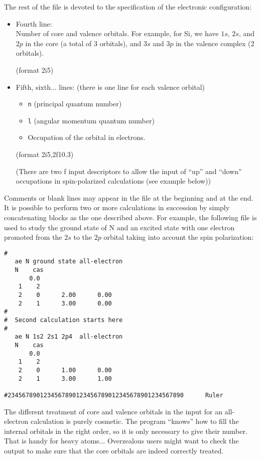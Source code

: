 \documentclass[11pt]{article}
\begin{document}
The rest of the file is devoted to the specification of the electronic
configuration:

\begin{itemize} 

\item Fourth line:\\
	 Number of core and valence orbitals. For example, for Si, we
	have $1s$, $2s$, and $2p$ in the core (a total of 3 orbitals), and
	$3s$ and $3p$ in the valence complex (2 orbitals).

	(format 2i5)

\item Fifth, sixth... lines: (there is one line for each valence
orbital)
	\begin{itemize}
	\item {\tt n} (principal quantum number)
	\item {\tt l} (angular momentum quantum number)
	\item Occupation of the orbital in electrons. 
	\end{itemize}

	(format 2i5,2f10.3)

	(There are two f input descriptors to allow the input of ``up''
	and ``down'' occupations in spin-polarized calculations (see
	example below))

\end{itemize}

Comments or blank lines may appear in the file at the beginning and at the end.
It is possible to perform two or more calculations in
succession by simply concatenating blocks as the one described above.
For example, the following file is used to study the ground state of N
and an excited state with one electron promoted from the $2s$ to the $2p$
orbital taking into account the spin polarization:

\begin{verbatim}
#
   ae N ground state all-electron
   N    cas
       0.0
    1    2
    2    0      2.00      0.00
    2    1      3.00      0.00
#
#  Second calculation starts here
#
   ae N 1s2 2s1 2p4  all-electron
   N    cas
       0.0
    1    2
    2    0      1.00      0.00
    2    1      3.00      1.00

#2345678901234567890123456789012345678901234567890      Ruler
\end{verbatim}

	
The different treatment of core and valence orbitals in the input for an
all-electron calculation is purely cosmetic. The program ``knows'' how
to fill the internal orbitals in the right order, so it is only
necessary to give their number. That is handy for heavy atoms...
Overzealous users might want to check the output to make sure that the
core orbitals are indeed correctly treated.
\end{document}
